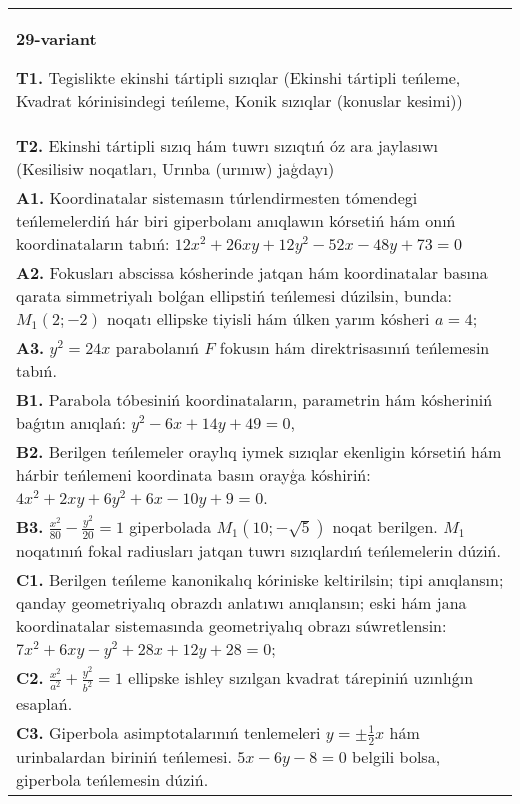 \documentclass{article}
\begin{document}
\begin{tabular}{m{17cm}}
\textbf{29-variant}
\newline

\textbf{T1.} Tegislikte ekinshi tártipli sızıqlar (Ekinshi tártipli teńleme, Kvadrat kórinisindegi teńleme, Konik sızıqlar (konuslar kesimi)) \\
\textbf{T2.} Ekinshi tártipli sızıq hám tuwrı sızıqtıń óz ara jaylasıwı (Kesilisiw noqatları, Urınba (urınıw) jaģdayı) \\
\textbf{A1.} Koordinatalar sistemasın túrlendirmesten tómendegi teńlemelerdiń hár biri giperbolanı anıqlawın kórsetiń hám onıń koordinataların tabıń: $12 x^2+26 x y+12 y^2-52 x-48 y+73=0$ \\
\textbf{A2.} Fokusları abscissa kósherinde jatqan hám koordinatalar basına qarata simmetriyalı bolǵan ellipstiń teńlemesi dúzilsin, bunda: $M_1 (2;-2) $ noqatı ellipske tiyisli hám úlken yarım kósheri $a=4$; \\
\textbf{A3.} $y^2=24 x$ parabolanıń $F$ fokusın hám direktrisasınıń teńlemesin tabıń. \\
\textbf{B1.} Parabola tóbesiniń koordinataların, parametrin hám kósheriniń baǵıtın anıqlań: $y^2-6 x+14 y+49=0$, \\
\textbf{B2.} Berilgen teńlemeler oraylıq iymek sızıqlar ekenligin kórsetiń hám hárbir teńlemeni koordinata basın orayģa kóshiriń:  $4 x^2+2 x y+6 y^2+6 x-10 y+9=0$. \\
\textbf{B3.} $\frac{x^2}{80}-\frac{y^2}{20}=1$ giperbolada $M_1 (10;-\sqrt{5}) $ noqat berilgen. $M_1$ noqatınıń fokal radiusları jatqan tuwrı sızıqlardıń teńlemelerin dúziń. \\
\textbf{C1.} Berilgen teńleme kanonikalıq kóriniske keltirilsin; tipi anıqlansın; qanday geometriyalıq obrazdı anlatıwı anıqlansın; eski hám jana koordinatalar sistemasında geometriyalıq obrazı súwretlensin: $7 x^2+6 x y-y^2+28 x+12 y+28=0$; \\
\textbf{C2.} $\frac{x^2}{a^2}+\frac{y^2}{b^2}=1$ ellipske ishley sızılgan kvadrat tárepiniń uzınlıǵın esaplań. \\
\textbf{C3.} Giperbola asimptotalarınıń tenlemeleri $y= \pm \frac{1}{2} x$ hám urinbalardan biriniń teńlemesi. $5 x-6 y-8=0$ belgili bolsa, giperbola teńlemesin dúziń. \\

\end{tabular}
\vspace{1cm}
\end{document}
